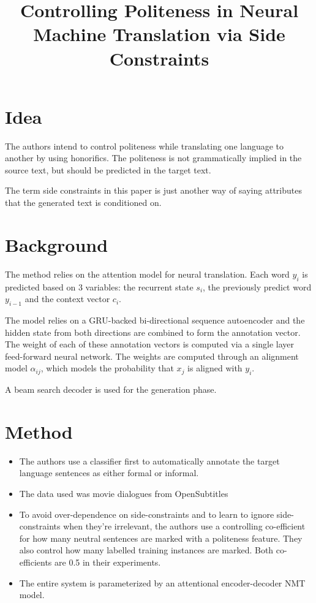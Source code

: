 \documentclass[12pt]{article}
\begin{document}
\title{Controlling Politeness in Neural Machine Translation via Side Constraints}
\author{}
\date{}
\maketitle

\section{Idea}
  The authors intend to control politeness while translating one language to another by using honorifics. The politeness is not grammatically implied in the source text, but should be predicted in the target text.
  
  The term side constraints in this paper is just another way of saying attributes that the generated text is conditioned on.

\section{Background}
  The method relies on the attention model \cite{bahdanau2014neural} for neural translation. Each word $y_i$ is predicted based on 3 variables: the recurrent state $s_i$, the previously predict word $y_{i - 1}$ and the context vector $c_i$.

  The model relies on a GRU-backed bi-directional sequence autoencoder and the hidden state from both directions are combined to form the annotation vector. The weight of each of these annotation vectors is computed via a single layer feed-forward neural network. The weights are computed through an alignment model $\alpha_{ij}$, which models the probability that $x_j$ is aligned with $y_i$.

  A beam search decoder is used for the generation phase.

\section{Method}
  \begin{itemize}
    \item The authors use a classifier first to automatically annotate the target language sentences as either formal or informal.
    \item The data used was movie dialogues from OpenSubtitles
    \item To avoid over-dependence on side-constraints and to learn to ignore side-constraints when they're irrelevant, the authors use a controlling co-efficient for how many neutral sentences are marked with a politeness feature. They also control how many labelled training instances are marked. Both co-efficients are 0.5 in their experiments.
    \item The entire system is parameterized by an attentional encoder-decoder NMT model.
  \end{itemize}
\end{document}
